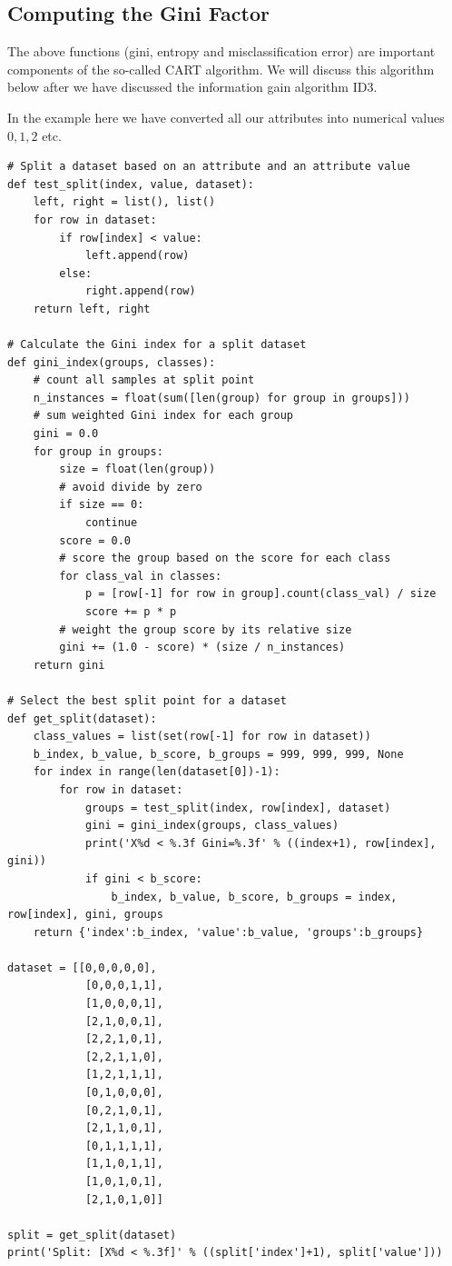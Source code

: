 \documentclass[%
oneside,                 %
final,                   %
10pt]{article}
\begin{document}
\subsection*{Computing the Gini Factor}

The above functions (gini, entropy and misclassification error) are
important components of the so-called CART algorithm. We will discuss
this algorithm below after we have discussed the information gain
algorithm ID3.

In the example here we have converted all our attributes into numerical values $0,1,2$ etc.

\begin{verbatim}
# Split a dataset based on an attribute and an attribute value
def test_split(index, value, dataset):
	left, right = list(), list()
	for row in dataset:
		if row[index] < value:
			left.append(row)
		else:
			right.append(row)
	return left, right
 
# Calculate the Gini index for a split dataset
def gini_index(groups, classes):
	# count all samples at split point
	n_instances = float(sum([len(group) for group in groups]))
	# sum weighted Gini index for each group
	gini = 0.0
	for group in groups:
		size = float(len(group))
		# avoid divide by zero
		if size == 0:
			continue
		score = 0.0
		# score the group based on the score for each class
		for class_val in classes:
			p = [row[-1] for row in group].count(class_val) / size
			score += p * p
		# weight the group score by its relative size
		gini += (1.0 - score) * (size / n_instances)
	return gini

# Select the best split point for a dataset
def get_split(dataset):
	class_values = list(set(row[-1] for row in dataset))
	b_index, b_value, b_score, b_groups = 999, 999, 999, None
	for index in range(len(dataset[0])-1):
		for row in dataset:
			groups = test_split(index, row[index], dataset)
			gini = gini_index(groups, class_values)
			print('X%d < %.3f Gini=%.3f' % ((index+1), row[index], gini))
			if gini < b_score:
				b_index, b_value, b_score, b_groups = index, row[index], gini, groups
	return {'index':b_index, 'value':b_value, 'groups':b_groups}
 
dataset = [[0,0,0,0,0],
            [0,0,0,1,1],
            [1,0,0,0,1],
            [2,1,0,0,1],
            [2,2,1,0,1],
            [2,2,1,1,0],
            [1,2,1,1,1],
            [0,1,0,0,0],
            [0,2,1,0,1],
            [2,1,1,0,1],
            [0,1,1,1,1],
            [1,1,0,1,1],
            [1,0,1,0,1],
            [2,1,0,1,0]]

split = get_split(dataset)
print('Split: [X%d < %.3f]' % ((split['index']+1), split['value']))
\end{verbatim}
\end{document}
